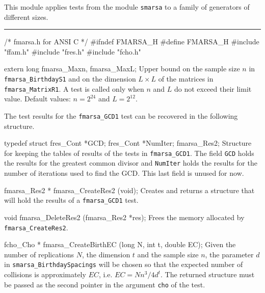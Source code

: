 
This module applies tests from the module {\tt smarsa}
to a family of generators of different sizes.


\bigskip\hrule
\code\hide
/* fmarsa.h for ANSI C */
#ifndef FMARSA_H
#define FMARSA_H
\endhide
#include "ffam.h"
#include "fres.h"
#include "fcho.h"


extern long fmarsa_Maxn, fmarsa_MaxL;
\endcode
\tab
  Upper bound on the sample size $n$  in {\tt fmarsa\_BirthdayS1} and on
  the dimension  $L \times L$ of the matrices in {\tt fmarsa\_MatrixR1}.
  A test is called only when $n$ and $L$ do not exceed their limit value.
  Default values: $n = 2^{24}$ and $L = 2^{12}$.
\endtab

\ifdetailed  %



The test results for the {\tt fmarsa\_GCD1} test can be recovered
in the following structure.

\code

typedef struct {
   fres_Cont *GCD;
   fres_Cont *NumIter;
} fmarsa_Res2;
\endcode
 \tab
  Structure for keeping the tables of results of the tests in
  {\tt fmarsa\_GCD1}. The field {\tt GCD} holds the results for the
  greatest common divisor  and {\tt NumIter} holds the results for the
  number of iterations used to find the GCD.
  This last field is unused for now.
 \endtab
\code


fmarsa_Res2 * fmarsa_CreateRes2 (void);
\endcode
 \tab
  Creates and returns a structure that will hold the results
  of a  {\tt fmarsa\_GCD1} test.
 \endtab
\code


void fmarsa_DeleteRes2 (fmarsa_Res2 *res);
\endcode
 \tab
  Frees the memory allocated by {\tt fmarsa\_CreateRes2}.
 \endtab

\fi    %




\code

fcho_Cho * fmarsa_CreateBirthEC (long N, int t, double EC);
\endcode
 \tab
  Given the number of replications $N$, the dimension $t$ and the sample
  size $n$, the parameter $d$ in {\tt smarsa\_BirthdaySpacings} will be chosen
  so that the expected number of collisions is approximately $EC$,
  i.e. $EC = Nn^3/4d^t$.
  The returned structure must be passed as the second pointer in the
  argument {\tt cho} of the test.
 \endtab
\code


